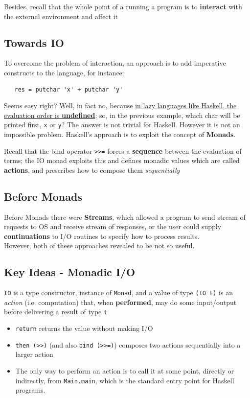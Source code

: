 Besides, recall that the whole point of a running a program is to \textbf{interact}
with the external environment and affect it

\subsection{Towards IO}
To overcome the problem of interaction, an approach is to add imperative constructs to the language,
for instance:
\begin{lstlisting}
   res = putchar 'x' + putchar 'y'
\end{lstlisting}
Seems easy right?
Well, in fact no, because \ul{in lazy languages like Haskell,
the evaluation order is \textbf{undefined}};
so, in the previous example, which char will be printed first, \lstinline|x| or \lstinline|y|?
The answer is not trivial for Haskell.
However it is not an impossible problem.
Haskell's approach is to exploit the concept of \textbf{Monads}.

Recall that the bind operator \lstinline|>>=| forces a \textbf{sequence} between the evaluation of terms;
the IO monad exploits this and defines monadic values which are called \textbf{actions}, and prescribes how to compose
them \textit{sequentially}


\subsection*{Before Monads}
Before Monads there were \textbf{Streams}, which allowed a program to send stream of requests to OS and receive stream of responses,
or the user could supply \textbf{continuations} to I/O routines
to specify how to process results.\\
However, both of these approaches revealed to be not so useful.

\subsection{Key Ideas - Monadic I/O}

\lstinline|IO| is a type constructor, instance of \lstinline|Monad|, and a value of type \lstinline|(IO t)| is an
\textit{action} (i.e. computation) that, when \textbf{performed}, may do some
input/output before delivering a result of type \lstinline|t|
\begin{itemize}
   \item 
   \lstinline|return| returns the value without making I/O
   \item
   \lstinline|then (>>)| (and also \lstinline|bind (>>=)|) composes two
   actions sequentially into a larger action
   \item
   The only way to perform an action is to call it at
   some point, directly or indirectly, from
   \lstinline|Main.main|,
   which is the standard entry point for Haskell programs.
\end{itemize}

